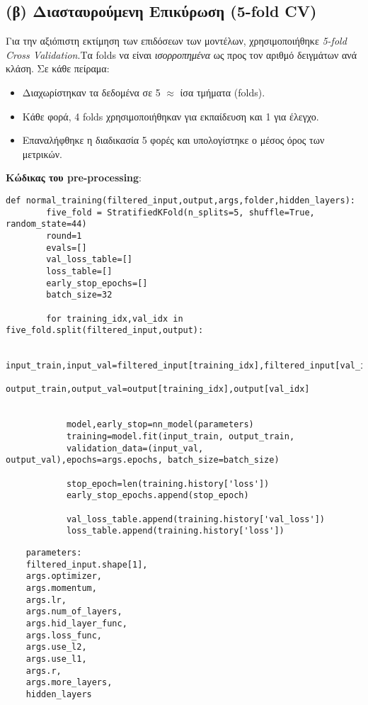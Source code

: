 \documentclass[a4paper,11pt]{article}
\begin{document}
    

\subsection{(β) Διασταυρούμενη Επικύρωση (5-fold CV)}
Για την αξιόπιστη εκτίμηση των επιδόσεων των μοντέλων, χρησιμοποιήθηκε \emph{5-fold
Cross Validation}.Τα folds να είναι \emph{ισορροπημένα} ως προς
τον αριθμό δειγμάτων ανά κλάση. Σε κάθε πείραμα:
\begin{itemize}
    \item Διαχωρίστηκαν τα δεδομένα σε 5 $\approx$ ίσα τμήματα (folds).
    \item Κάθε φορά, 4 folds χρησιμοποιήθηκαν για εκπαίδευση και 1 για έλεγχο.
    \item Επαναλήφθηκε η διαδικασία 5 φορές και υπολογίστηκε ο μέσος όρος των μετρικών.
\end{itemize}

\textbf{Κώδικας του pre-processing}:
\begin{verbatim}
def normal_training(filtered_input,output,args,folder,hidden_layers):
        five_fold = StratifiedKFold(n_splits=5, shuffle=True, random_state=44) 
        round=1
        evals=[]
        val_loss_table=[]
        loss_table=[]
        early_stop_epochs=[]
        batch_size=32

        for training_idx,val_idx in five_fold.split(filtered_input,output):

            input_train,input_val=filtered_input[training_idx],filtered_input[val_idx]
            output_train,output_val=output[training_idx],output[val_idx]

            
            model,early_stop=nn_model(parameters)
            training=model.fit(input_train, output_train,
            validation_data=(input_val, output_val),epochs=args.epochs, batch_size=batch_size)

            stop_epoch=len(training.history['loss'])
            early_stop_epochs.append(stop_epoch)

            val_loss_table.append(training.history['val_loss'])
            loss_table.append(training.history['loss'])
    \end{verbatim}

\begin{verbatim}
    parameters:
    filtered_input.shape[1],
    args.optimizer,
    args.momentum,
    args.lr,
    args.num_of_layers,
    args.hid_layer_func,
    args.loss_func,
    args.use_l2,
    args.use_l1,
    args.r,
    args.more_layers,
    hidden_layers
    \end{verbatim}
\end{document}
